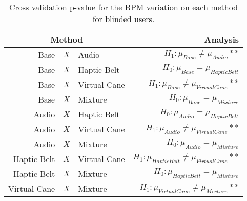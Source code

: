 
\begin{table}[!htb]
\centering
\caption{Cross validation p-value for the BPM variation on each method for blinded users.}
\label{tab:lsdbloc_bpm_var_blind}
\begin{tabular}{rclr}
\toprule
      \multicolumn{3}{c}{Method} &                                           Analysis \\
\midrule
              Base & $X$ & Audio &               $H_1 : \mu_{Base} \ne \mu_{Audio}**$ \\
        Base & $X$ & Haptic Belt &             $H_0 : \mu_{Base} = \mu_{Haptic Belt}$ \\
       Base & $X$ & Virtual Cane &        $H_1 : \mu_{Base} \ne \mu_{Virtual Cane}**$ \\
            Base & $X$ & Mixture &                 $H_0 : \mu_{Base} = \mu_{Mixture}$ \\
       Audio & $X$ & Haptic Belt &            $H_0 : \mu_{Audio} = \mu_{Haptic Belt}$ \\
      Audio & $X$ & Virtual Cane &       $H_1 : \mu_{Audio} \ne \mu_{Virtual Cane}**$ \\
           Audio & $X$ & Mixture &                $H_0 : \mu_{Audio} = \mu_{Mixture}$ \\
Haptic Belt & $X$ & Virtual Cane & $H_1 : \mu_{Haptic Belt} \ne \mu_{Virtual Cane}**$ \\
     Haptic Belt & $X$ & Mixture &          $H_0 : \mu_{Haptic Belt} = \mu_{Mixture}$ \\
    Virtual Cane & $X$ & Mixture &     $H_1 : \mu_{Virtual Cane} \ne \mu_{Mixture}**$ \\
\bottomrule
\end{tabular}
\end{table}

